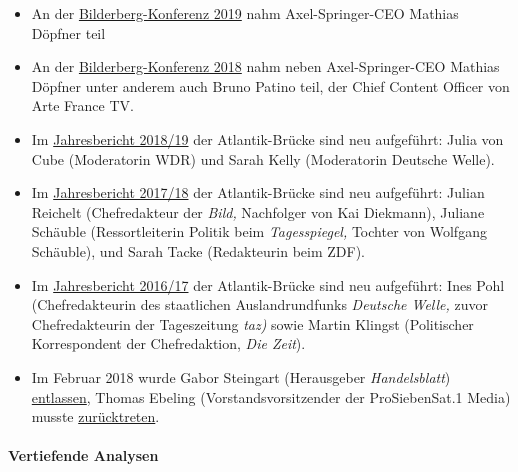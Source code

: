\begin{itemize}
\tightlist
\item
  An der
  \href{https://www.bilderbergmeetings.org/meetings/meeting-2019/participants-2019}{Bilderberg-Konferenz
  2019} nahm Axel-Springer-CEO Mathias Döpfner teil
\item
  An der
  \href{https://www.bilderbergmeetings.org/meetings/meeting-2018/participants-2018}{Bilderberg-Konferenz
  2018} nahm neben Axel-Springer-CEO Mathias Döpfner unter anderem auch
  Bruno Patino teil, der Chief Content Officer von Arte France TV.
\item
  Im
  \href{https://www.atlantik-bruecke.org/unsere-arbeit/publikationen/jahresberichte/}{Jahresbericht
  2018/19} der Atlantik-Brücke sind neu aufgeführt: Julia von Cube
  (Moderatorin WDR) und Sarah Kelly (Moderatorin Deutsche Welle).
\item
  Im
  \href{https://www.atlantik-bruecke.org/unsere-arbeit/publikationen/jahresberichte/}{Jahresbericht
  2017/18} der Atlantik-Brücke sind neu aufgeführt: Julian Reichelt
  (Chefredakteur der \emph{Bild,} Nachfolger von Kai Diekmann), Juliane
  Schäuble (Ressortleiterin Politik beim \emph{Tagesspiegel,} Tochter
  von Wolfgang Schäuble), und Sarah Tacke (Redakteurin beim ZDF).
\item
  Im
  \href{https://www.atlantik-bruecke.org/unsere-arbeit/publikationen/jahresberichte/}{Jahresbericht
  2016/17} der Atlantik-Brücke sind neu aufgeführt: Ines Pohl
  (Chefredakteurin des staatlichen Auslandrundfunks \emph{Deutsche
  Welle,} zuvor Chefredakteurin der Tageszeitung \emph{taz)} sowie
  Martin Klingst (Politischer Korrespondent der Chefredaktion, \emph{Die
  Zeit}).
\item
  Im Februar 2018 wurde Gabor Steingart (Herausgeber
  \emph{Handelsblatt})
  \href{https://de.wikipedia.org/wiki/Gabor_Steingart}{entlassen},
  Thomas Ebeling (Vorstandsvorsitzender der ProSiebenSat.1 Media) musste
  \href{https://de.wikipedia.org/wiki/Thomas_Ebeling_(Manager)}{zurücktreten}.
\end{itemize}

\hypertarget{vertiefende-analysen}{%
\paragraph{Vertiefende Analysen}\label{vertiefende-analysen}}

